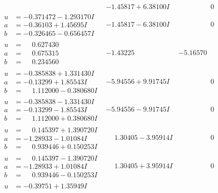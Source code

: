 \documentclass[1p]{elsarticle_modified}
\theoremstyle{definition}
\begin{document}
$$\begin{array}{c|c|c}
 & -1.45817 + 6.38100 I & \phantom{-0.000000 } 0 \\ \hline\begin{aligned}
u &= -0.371472 - 1.293170 I \\
a &= -0.36103 + 1.45695 I \\
b &= -0.326465 - 0.656457 I\end{aligned}
 & -1.45817 - 6.38100 I & \phantom{-0.000000 } 0 \\ \hline\begin{aligned}
u &= \phantom{-}0.627430\phantom{ +0.000000I} \\
a &= \phantom{-}0.675315\phantom{ +0.000000I} \\
b &= \phantom{-}0.234560\phantom{ +0.000000I}\end{aligned}
 & -1.43225\phantom{ +0.000000I} & -5.16570\phantom{ +0.000000I} \\ \hline\begin{aligned}
u &= -0.385838 + 1.331430 I \\
a &= -0.13299 + 1.85543 I \\
b &= \phantom{-}1.112000 - 0.380680 I\end{aligned}
 & -5.94556 + 9.91745 I & \phantom{-0.000000 } 0 \\ \hline\begin{aligned}
u &= -0.385838 - 1.331430 I \\
a &= -0.13299 - 1.85543 I \\
b &= \phantom{-}1.112000 + 0.380680 I\end{aligned}
 & -5.94556 - 9.91745 I & \phantom{-0.000000 } 0 \\ \hline\begin{aligned}
u &= \phantom{-}0.145397 + 1.390720 I \\
a &= -1.28933 - 1.01084 I \\
b &= \phantom{-}0.939446 + 0.150253 I\end{aligned}
 & \phantom{-}1.30405 - 3.95914 I & \phantom{-0.000000 } 0 \\ \hline\begin{aligned}
u &= \phantom{-}0.145397 - 1.390720 I \\
a &= -1.28933 + 1.01084 I \\
b &= \phantom{-}0.939446 - 0.150253 I\end{aligned}
 & \phantom{-}1.30405 + 3.95914 I & \phantom{-0.000000 } 0 \\ \hline\begin{aligned}
u &= -0.39751 + 1.35949 I \\

\end{aligned}
\end{array}$$
\end{document}
